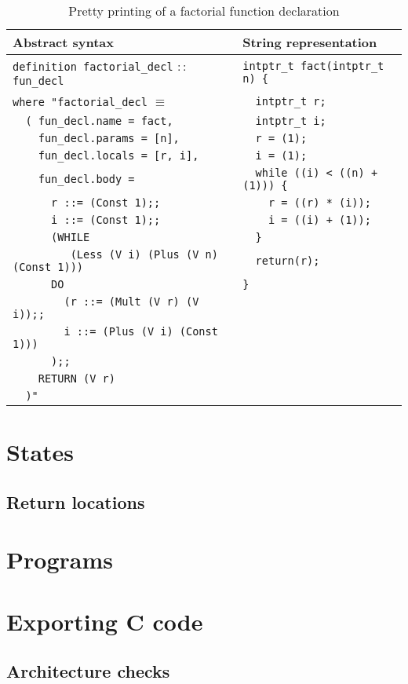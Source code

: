 \begin{table}[h!]
\centering
\begin{tabular}{|l|l|}
  \hline
  \textbf{Abstract syntax} & \textbf{String representation} \\ [0.5ex]
  \hline \hline
  \verb|definition factorial_decl| $::$ \verb|fun_decl|  & \verb|intptr_t fact(intptr_t n) {| \\
  \verb|where "factorial_decl| $\equiv$                  & \verb|  intptr_t r;| \\
  \verb|  ( fun_decl.name = fact,|                       & \verb|  intptr_t i;| \\
  \verb|    fun_decl.params = [n],|                      & \verb|  r = (1);| \\
  \verb|    fun_decl.locals = [r, i],|                   & \verb|  i = (1);| \\
  \verb|    fun_decl.body =|                             & \verb|  while ((i) < ((n) + (1))) {| \\
  \verb|      r ::= (Const 1);;|                         & \verb|    r = ((r) * (i));| \\
  \verb|      i ::= (Const 1);;|                         & \verb|    i = ((i) + (1));| \\
  \verb|      (WHILE|                                    & \verb|  }| \\
  \verb|         (Less (V i) (Plus (V n) (Const 1)))|    & \verb|  return(r);| \\
  \verb|      DO|                                        & \verb|}| \\
  \verb|        (r ::= (Mult (V r) (V i));;|             & \\
  \verb|        i ::= (Plus (V i) (Const 1)))|           & \\
  \verb|      );;|                                       & \\
  \verb|    RETURN (V r)|                                & \\
  \verb|  )"|                                            & \\
  \hline
\end{tabular}

\caption{Pretty printing of a factorial function declaration}
\label{tab:pretty_function_fact}
\end{table}


\section{States}
\subsection{Return locations}
\section{Programs}
\section{Exporting C code}
\subsection{Architecture checks}